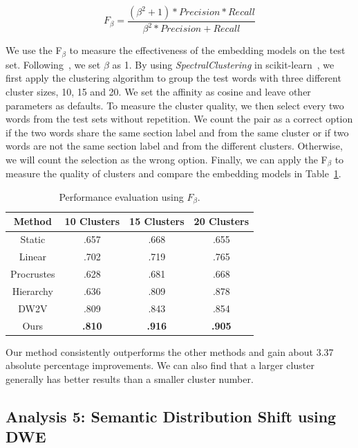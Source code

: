 $$F_\beta = \frac{(\beta^2 + 1) * Precision * Recall}{\beta^2*Precision + Recall}$$

We use the F$_\beta$ to measure the effectiveness of the embedding models on the test set.
Following~\cite{yao2018dynamic}, we set $\beta$ as 1.
By using \textit{SpectralClustering} in scikit-learn~\cite{pedregosa2011scikit}, we first apply the clustering algorithm to group the test words with three different cluster sizes, 10, 15 and 20. 
We set the affinity as cosine and leave other parameters as defaults.
To measure the cluster quality, we then select every two words from the test sets without repetition.
We count the pair as a correct option if the two words share the same section label and from the same cluster or if two words are not the same section label and from the different clusters.
Otherwise, we will count the selection as the wrong option.
Finally, we can apply the F$_\beta$ to measure the quality of clusters and compare the embedding models in Table~\ref{chap3:tab:dweEval}.

\begin{table}[htp]
\centering
\begin{tabular}{c||ccc}
Method & 10 Clusters & 15 Clusters & 20 Clusters \\\hline\hline
Static & .657 & .668 & .655 \\
Linear & .702 & .719 & .765 \\
Procrustes & .628 & .681 & .668 \\
Hierarchy & .636 & .809 & .878 \\
DW2V & .809 & .843 & .854 \\
Ours & \textbf{.810} & \textbf{.916} & \textbf{.905}
\end{tabular}
\caption{Performance evaluation using $F_\beta$.}
\label{chap3:tab:dweEval}
\end{table}

Our method consistently outperforms the other methods and gain about 3.37 absolute percentage improvements. We can also find that a larger cluster generally has better results than a smaller cluster number.


\subsection{Analysis 5: Semantic Distribution Shift using DWE}


